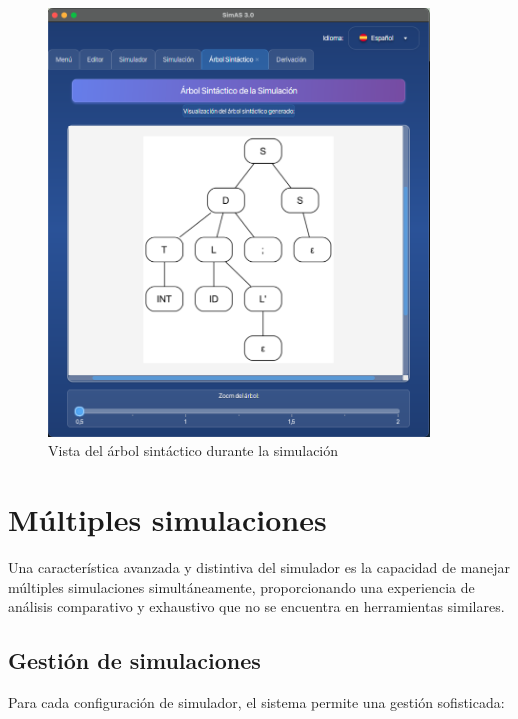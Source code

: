 \needspace{8cm}
\begin{figure}[H]
    \centering
    \includegraphics[width=0.9\textwidth]{figuras/simulador/simulacion_arbol.png}
    \caption{Vista del árbol sintáctico durante la simulación}
    \label{fig:simulacion_arbol}
\end{figure}

\section{Múltiples simulaciones}

Una característica avanzada y distintiva del simulador es la capacidad de manejar múltiples simulaciones simultáneamente, proporcionando una experiencia de análisis comparativo y exhaustivo que no se encuentra en herramientas similares.

\subsection{Gestión de simulaciones}

Para cada configuración de simulador, el sistema permite una gestión sofisticada:


